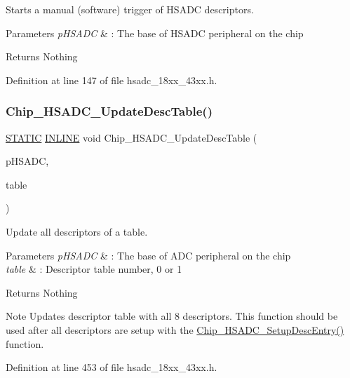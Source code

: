 Starts a manual (software) trigger of H\+S\+A\+DC descriptors. 


\begin{DoxyParams}{Parameters}
{\em p\+H\+S\+A\+DC} & \+: The base of H\+S\+A\+DC peripheral on the chip \\
\hline
\end{DoxyParams}
\begin{DoxyReturn}{Returns}
Nothing 
\end{DoxyReturn}


Definition at line 147 of file hsadc\+\_\+18xx\+\_\+43xx.\+h.

\mbox{\label{group___h_s_a_d_c__18_x_x__43_x_x_ga61445a76cda41f938d5be8f291caa520}} 
\subsubsection{\texorpdfstring{Chip\+\_\+\+H\+S\+A\+D\+C\+\_\+\+Update\+Desc\+Table()}{Chip\_HSADC\_UpdateDescTable()}}
{\footnotesize\ttfamily \hyperlink{group___l_p_c___types___public___macros_ga10b2d890d871e1489bb02b7e70d9bdfb}{S\+T\+A\+T\+IC} \hyperlink{spifi__18xx__43xx_8h_a2eb6f9e0395b47b8d5e3eeae4fe0c116}{I\+N\+L\+I\+NE} void Chip\+\_\+\+H\+S\+A\+D\+C\+\_\+\+Update\+Desc\+Table (\begin{DoxyParamCaption}\item[{\hyperlink{struct_l_p_c___h_s_a_d_c___t}{L\+P\+C\+\_\+\+H\+S\+A\+D\+C\+\_\+T} $\ast$}]{p\+H\+S\+A\+DC,  }\item[{uint8\+\_\+t}]{table }\end{DoxyParamCaption})}



Update all descriptors of a table. 


\begin{DoxyParams}{Parameters}
{\em p\+H\+S\+A\+DC} & \+: The base of A\+DC peripheral on the chip \\
\hline
{\em table} & \+: Descriptor table number, 0 or 1 \\
\hline
\end{DoxyParams}
\begin{DoxyReturn}{Returns}
Nothing 
\end{DoxyReturn}
\begin{DoxyNote}{Note}
Updates descriptor table with all 8 descriptors. This function should be used after all descriptors are setup with the \hyperlink{group___h_s_a_d_c__18_x_x__43_x_x_gaaa3661b82ab37e1cb31e248713451705}{Chip\+\_\+\+H\+S\+A\+D\+C\+\_\+\+Setup\+Desc\+Entry()} function. 
\end{DoxyNote}


Definition at line 453 of file hsadc\+\_\+18xx\+\_\+43xx.\+h.

